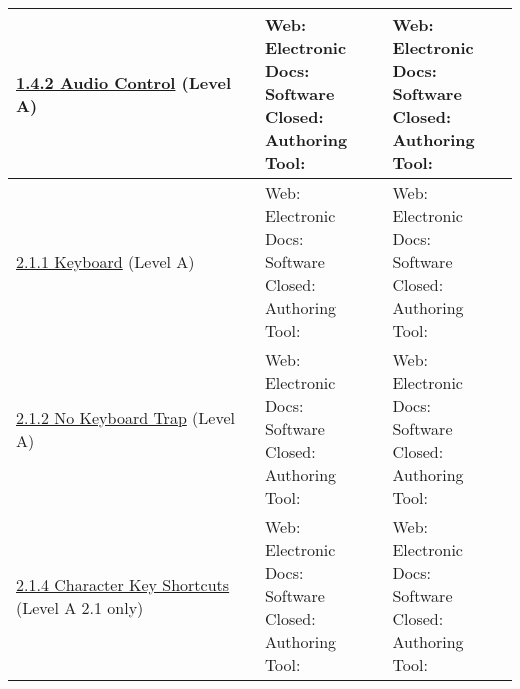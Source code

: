 \documentclass[a4paper]{report}
\begin{document}
\begin{longtable}{|l|l|l|}
        \hline
        \href{http://www.w3.org/TR/WCAG20/#visual-audio-contrast-dis-audio}{1.4.2 Audio Control} (Level A) & \makecell{Web: \\ Electronic Docs: \\ Software \\ Closed: \\ Authoring Tool:} & \makecell{Web: \\ Electronic Docs: \\ Software \\ Closed: \\ Authoring Tool:}\\
        \hline
        \href{http://www.w3.org/TR/WCAG20/#keyboard-operation-keyboard-operable}{2.1.1 Keyboard} (Level A) & \makecell{Web: \\ Electronic Docs: \\ Software \\ Closed: \\ Authoring Tool:} & \makecell{Web: \\ Electronic Docs: \\ Software \\ Closed: \\ Authoring Tool:}\\
        \hline
        \href{http://www.w3.org/TR/WCAG20/#keyboard-operation-trapping}{2.1.2 No Keyboard Trap} (Level A) &\makecell{Web: \\ Electronic Docs: \\ Software \\ Closed: \\ Authoring Tool:} & \makecell{Web: \\ Electronic Docs: \\ Software \\ Closed: \\ Authoring Tool:}\\
        \hline
        \href{https://www.w3.org/TR/WCAG21/#character-key-shortcuts}{2.1.4 Character Key Shortcuts} (Level A 2.1 only) &\makecell{Web: \\ Electronic Docs: \\ Software \\ Closed: \\ Authoring Tool:} & \makecell{Web: \\ Electronic Docs: \\ Software \\ Closed: \\ Authoring Tool:}\\
        \hline

\end{longtable}
\end{document}

